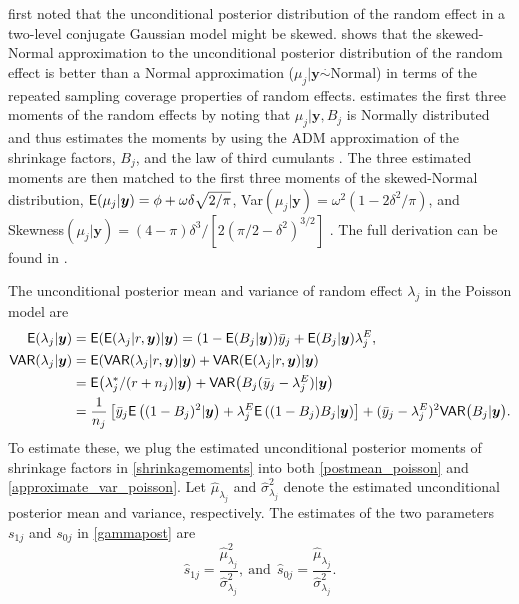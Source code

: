\documentclass[article]{jss}
\begin{document}
\cite{morris2012} first noted that the unconditional posterior distribution of
the random effect in a two-level conjugate Gaussian model might be
skewed. \cite{kelly2014advances}  shows that the skewed-Normal approximation to
the unconditional posterior distribution of the random effect is better than a
Normal approximation ($\mu_j\vert\boldsymbol{y}\stackrel{.}{\sim} \textrm{Normal}$) in terms
of the repeated sampling coverage properties of random
effects. \cite{kelly2014advances} estimates the first three moments of
the random effects by noting that $\mu_j | \mathbf{y}, B_{j}$ is Normally
distributed and thus estimates the moments by using the ADM approximation of
the shrinkage factors, $B_{j}$, and the law of third cumulants \citep{brill}. The
three estimated moments are then matched to the first three moments of the
skewed-Normal distribution, $\mathsf{E}(\mu_j\vert \boldsymbol{y})
=\phi+\omega\delta\sqrt{2/\pi}$, Var$(\mu_j\vert
\boldsymbol{y})=\omega^2(1-2\delta^2/\pi)$, and Skewness$(\mu_j\vert
\boldsymbol{y})=(4-\pi)\delta^3/[2(\pi/2-\delta^2)^{3/2}]$
\citep{azzalini1985class}. The full derivation can be found in \cite{kelly2014advances}. 



The unconditional posterior mean and variance of random effect $\lambda_j$ in the Poisson model are
\begin{align}
\mathsf{E}(\lambda_j\vert \boldsymbol{y}) &=\mathsf{E}(\mathsf{E}(\lambda_{j}\vert r, \boldsymbol{y})\vert\boldsymbol{y})=(1-\mathsf{E}(B_j\vert\boldsymbol{y}))\bar{y}_j + \mathsf{E}(B_j\vert  \boldsymbol{y})\lambda^E_j,\label{postmean_poisson} \\
\mathsf{VAR}(\lambda_{j}\vert \boldsymbol{y}) &=  \mathsf{E}(\mathsf{VAR}(\lambda_{j}\vert r,  \boldsymbol{y})\vert \boldsymbol{y})+\mathsf{VAR}(\mathsf{E}(\lambda_{j}\vert r, \boldsymbol{y})\vert \boldsymbol{y})\label{postvar_poisson}\\
&= \mathsf{E}\big(\lambda^{\ast}_{j}/ (r+n_{j})\vert  \boldsymbol{y}\big)+\mathsf{VAR}\big(B_{j}(\bar{y}_{j}-\lambda^E_{j})\vert \boldsymbol{y}\big) \\
&=\frac{1}{n_j}\left[\bar{y}_j\mathsf{E}\left((1-B_j)^2\vert \boldsymbol{y}\right)+\lambda^E_j\mathsf{E}\left((1-B_j)B_j\vert \boldsymbol{y}\right)\right]+(\bar{y}_{j}-\lambda^E_{j})^2\mathsf{VAR}\big(B_{j}\vert \boldsymbol{y}\big).\label{approximate_var_poisson}
\end{align}
To estimate these, we plug  the estimated unconditional posterior moments of shrinkage factors in \eqref{shrinkagemoments} into both \eqref{postmean_poisson} and \eqref{approximate_var_poisson}. Let  $\hat{\mu}_{\lambda_j}$ and $\hat{\sigma}^2_{\lambda_j}$ denote the estimated unconditional posterior mean and variance, respectively. The estimates of the two parameters $s_{1j}$ and $s_{0j}$ in  \eqref{gammapost} are
\begin{equation}\label{posttrueprob}
\hat{s}_{1j}=\frac{\hat{\mu}_{\lambda_j}^2}{\hat{\sigma}^2_{\lambda_j}},~\textrm{and}~~\hat{s}_{0j}=\frac{\hat{\mu}_{\lambda_j}}{\hat{\sigma}^2_{\lambda_j}}.
\end{equation}
\end{document}
